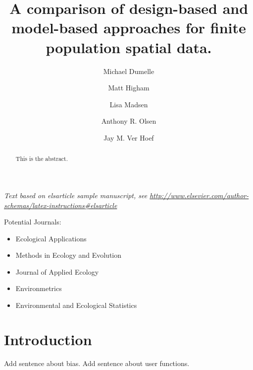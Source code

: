 \documentclass[]{elsarticle} %
\providecommand{\tightlist}{%
  \setlength{\itemsep}{0pt}\setlength{\parskip}{0pt}}
\begin{document}
\begin{frontmatter}

  \title{A comparison of design-based and model-based approaches for finite
population spatial data.}
    \author[USEPA]{Michael Dumelle}
    \author[STLAW]{Matt Higham}
    \author[OSU]{Lisa Madsen}
  
    \author[USEPA]{Anthony R. Olsen}
  
    \author[NOAA]{Jay M. Ver Hoef}
  
      \address[USEPA]{United States Environmental Protection Agency, 200 SW 35th St,
Corvallis, Oregon, 97333}
    \address[STLAW]{Saint Lawrence University Department of Mathematics, Computer Science,
and Statistics, 23 Romoda Drive, Canton, New York, 13617}
    \address[OSU]{Oregon State University Department of Statistics, 239 Weniger Hall,
Corvallis, Oregon, 97331}
    \address[NOAA]{Marine Mammal Laboratory, Alaska Fisheries Science Center, National
Oceanic and Atmospheric Administration, Seattle, Washington, 98115}
  
  \begin{abstract}
  This is the abstract.
  \end{abstract}
  
 \end{frontmatter}

\emph{Text based on elsarticle sample manuscript, see
\url{http://www.elsevier.com/author-schemas/latex-instructions\#elsarticle}}

Potential Journals:

\begin{itemize}
\tightlist
\item
  Ecological Applications
\item
  Methods in Ecology and Evolution
\item
  Journal of Applied Ecology
\item
  Environmetrics
\item
  Environmental and Ecological Statistics
\end{itemize}

\hypertarget{sec:introduction}{%
\section{Introduction}\label{sec:introduction}}

Add sentence about bias. Add sentence about user functions.
\end{document}
